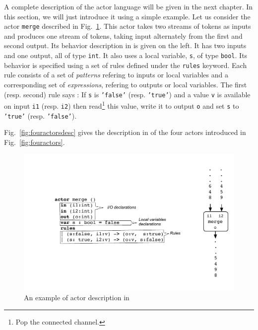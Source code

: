 A complete description of the actor language will be given in the next chapter. In this section, we
will just introduce it using a simple example. Let us consider the actor \texttt{merge} described in
Fig.~\ref{fig:mergeactor}. This actor takes two streams of tokens as inputs and produces one stream
of tokens, taking input alternately from the first and second output.  Its behavior description in
\caph is given on the left. It has two inputs and one output, all of type \texttt{int}. It also
uses a local variable, \texttt{s}, of type \texttt{bool}.
Its behavior is specified using a set of rules defined under the \texttt{rules} keyword.
Each rule consists of a set of \emph{patterns} refering to inputs or local variables and a
corresponding set of \emph{expressions}, refering to outputs or local variables.
The first (resp. second) rule
says : If \texttt{s} is \texttt{'false'} (resp. \texttt{'true'}) and a value \texttt{v} is available
on input \texttt{i1} (resp. \texttt{i2}) then read\footnote{Pop the connected channel.}
this value, write it to output \texttt{o} and set \texttt{s} to \texttt{'true'}
(resp. \texttt{'false'}).

Fig.~\ref{fig:fouractorsdesc} gives the description in \caph of the four actors introduced in
Fig.~\ref{fig:fouractors}. 

\begin{figure}[h]
  \centering
  \includegraphics[width=\linewidth]{figs/mergeactor}
  \caption{An example of actor description in \caph}
  \label{fig:mergeactor}
\end{figure}

